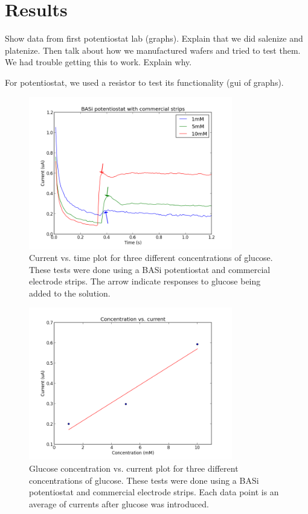 \section{Results}

Show data from first potentiostat lab (graphs). Explain that we did salenize and platenize. Then talk about how we manufactured wafers and tried to test them. We had trouble getting this to work. Explain why. 

For potentiostat, we used a resistor to test its functionality (gui of graphs). 


\begin{figure}[h]
\begin{center}
\includegraphics[width=3.5in]{../figures/basi.png}
\end{center}
\caption{Current vs. time plot for three different concentrations of glucose. These tests were done using a BASi potentiostat and commercial electrode strips. The arrow indicate responses to glucose being added to the solution.}
\end{figure}

\begin{figure}[h]
\begin{center}
\includegraphics[width=3.5in]{../figures/CI.png}
\end{center}
\caption{Glucose concentration vs. current plot for three different concentrations of glucose. These tests were done using a BASi potentiostat and commercial electrode strips. Each data point is an average of currents after glucose was introduced.}
\end{figure}

